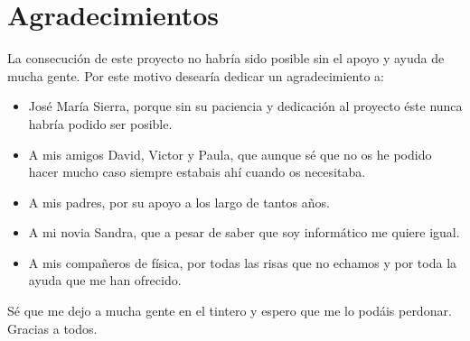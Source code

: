 \chapter{Agradecimientos} 

La consecución de este proyecto no habría sido posible sin el apoyo y ayuda de mucha gente. Por este motivo desearía dedicar un agradecimiento a:

\begin{itemize}

	\item José María Sierra, porque sin su paciencia y dedicación al proyecto éste nunca habría podido ser posible.
	
	\item A mis amigos David, Victor y Paula, que aunque sé que no os he podido hacer mucho caso siempre estabais ahí cuando os necesitaba.
	
	\item A mis padres, por su apoyo a los largo de tantos años.
	
	\item A mi novia Sandra, que a pesar de saber que soy informático me quiere igual.
	
	\item A mis compañeros de física, por todas las risas que no echamos y por toda la ayuda que me han ofrecido.

\end{itemize}

Sé que me dejo a mucha gente en el tintero y espero que me lo podáis perdonar. Gracias a todos.
